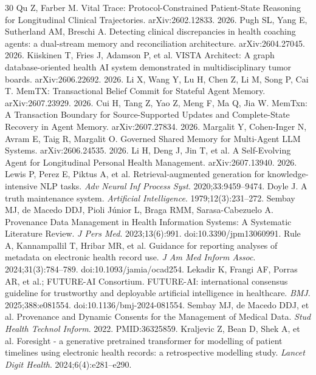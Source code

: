 \documentclass[11pt]{article}
\begin{document}
\begin{thebibliography}{30}
 Qu Z, Farber M. Vital Trace: Protocol-Constrained Patient-State Reasoning for Longitudinal Clinical Trajectories. arXiv:2602.12833. 2026.
 Pugh SL, Yang E, Sutherland AM, Breschi A. Detecting clinical discrepancies in health coaching agents: a dual-stream memory and reconciliation architecture. arXiv:2604.27045. 2026.
 Kiiskinen T, Fries J, Adamson P, et al. VISTA Architect: A graph database-oriented health AI system demonstrated in multidisciplinary tumor boards. arXiv:2606.22692. 2026.
 Li X, Wang Y, Lu H, Chen Z, Li M, Song P, Cai T. MemTX: Transactional Belief Commit for Stateful Agent Memory. arXiv:2607.23929. 2026.
 Cui H, Tang Z, Yao Z, Meng F, Ma Q, Jia W. MemTxn: A Transaction Boundary for Source-Supported Updates and Complete-State Recovery in Agent Memory. arXiv:2607.27834. 2026.
 Margalit Y, Cohen-Inger N, Avram E, Taig R, Margalit O. Governed Shared Memory for Multi-Agent LLM Systems. arXiv:2606.24535. 2026.
 Li H, Deng J, Jin T, et al. A Self-Evolving Agent for Longitudinal Personal Health Management. arXiv:2607.13940. 2026.
 Lewis P, Perez E, Piktus A, et al. Retrieval-augmented generation for knowledge-intensive NLP tasks. \emph{Adv Neural Inf Process Syst}. 2020;33:9459--9474.
 Doyle J. A truth maintenance system. \emph{Artificial Intelligence}. 1979;12(3):231--272.
 Sembay MJ, de Macedo DDJ, Pioli Júnior L, Braga RMM, Sarasa-Cabezuelo A. Provenance Data Management in Health Information Systems: A Systematic Literature Review. \emph{J Pers Med}. 2023;13(6):991. doi:10.3390/jpm13060991.
 Rule A, Kannampallil T, Hribar MR, et al. Guidance for reporting analyses of metadata on electronic health record use. \emph{J Am Med Inform Assoc}. 2024;31(3):784--789. doi:10.1093/jamia/ocad254.
 Lekadir K, Frangi AF, Porras AR, et al.; FUTURE-AI Consortium. FUTURE-AI: international consensus guideline for trustworthy and deployable artificial intelligence in healthcare. \emph{BMJ}. 2025;388:e081554. doi:10.1136/bmj-2024-081554.
 Sembay MJ, de Macedo DDJ, et al. Provenance and Dynamic Consents for the Management of Medical Data. \emph{Stud Health Technol Inform}. 2022. PMID:36325859.
 Kraljevic Z, Bean D, Shek A, et al. Foresight - a generative pretrained transformer for modelling of patient timelines using electronic health records: a retrospective modelling study. \emph{Lancet Digit Health}. 2024;6(4):e281--e290.

\end{thebibliography}
\end{document}

